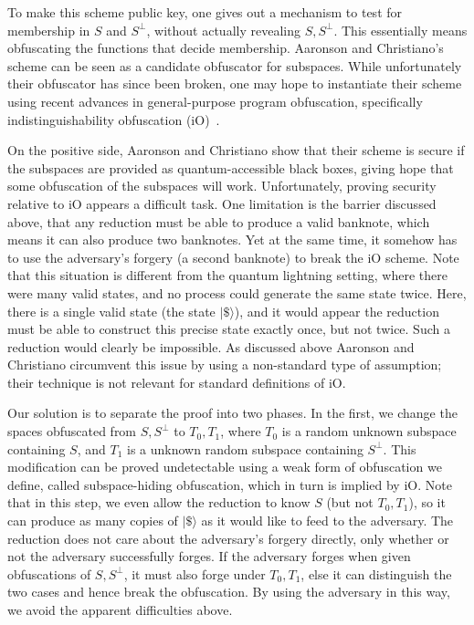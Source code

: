 To make this scheme public key, one gives out a mechanism to test for membership in $S$ and $S^\bot$, without actually revealing $S,S^\bot$.  This essentially means obfuscating the functions that decide membership.  Aaronson and Christiano's scheme can be seen as a candidate obfuscator for subspaces.  While unfortunately their obfuscator has since been broken, one may hope to instantiate their scheme using recent advances in general-purpose program obfuscation, specifically indistinguishability obfuscation (iO)~\cite{C:BGIRSVY01,FOCS:GGHRSW13}.  

On the positive side, Aaronson and Christiano show that their scheme is secure if the subspaces are provided as quantum-accessible black boxes, giving hope that some obfuscation of the subspaces will work.  Unfortunately, proving security relative to iO appears a difficult task.  One limitation is the barrier discussed above, that any reduction must be able to produce a valid banknote, which means it can also produce two banknotes.  Yet at the same time, it somehow has to use the adversary's forgery (a second banknote) to break the iO scheme.  Note that this situation is different from the quantum lightning setting, where there were many valid states, and no process could generate the same state twice.  Here, there is a single valid state (the state $|\$\rangle$), and it would appear the reduction must be able to construct this precise state exactly once, but not twice.  Such a reduction would clearly be impossible.  As discussed above Aaronson and Christiano circumvent this issue by using a non-standard type of assumption; their technique is not relevant for standard definitions of iO.

\medskip

Our solution is to separate the proof into two phases.  In the first, we change the spaces obfuscated from $S,S^\bot$ to $T_0,T_1$, where $T_0$ is a random unknown subspace containing $S$, and $T_1$ is a unknown random subspace containing $S^\bot$.  This modification can be proved undetectable using a weak form of obfuscation we define, called subspace-hiding obfuscation, which in turn is implied by iO.  Note that in this step, we even allow the reduction to know $S$ (but not $T_0,T_1$), so it can produce as many copies of $|\$\rangle$ as it would like to feed to the adversary.  The reduction does not care about the adversary's forgery directly, only whether or not the adversary successfully forges.  If the adversary forges when given obfuscations of $S,S^\bot$, it must also forge under $T_0,T_1$, else it can distinguish the two cases and hence break the obfuscation.  By using the adversary in this way, we avoid the apparent difficulties above.

